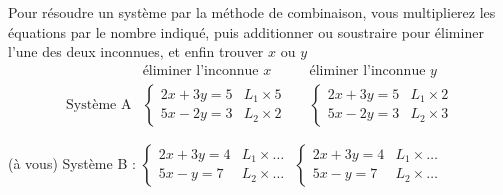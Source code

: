 \documentclass[main.tex]{subfiles}
\begin{document}
%	 
\begin{example} 
	Pour résoudre un système par la méthode de combinaison, vous multiplierez les équations par le nombre indiqué, puis additionner ou soustraire pour éliminer l’une des deux inconnues, et enfin trouver $x$ ou $y$  \vspace{-1em}
	\begin{align*} 
		& \text{éliminer l'inconnue $x$} && 
		\text{éliminer l'inconnue $y$}\\
		\text{Système A}&\begin{cases}
			2x + 3y = 5 & L_1 \times 5\\
			5x - 2y = 3 & L_2 \times 2 
		\end{cases}
		&& \begin{cases}
			2x + 3y = 5 & L_1 \times 2\\
			5x - 2y = 3
			& L_2 \times 3
		\end{cases}
	\end{align*}
\vfill

\noindent (à vous) Système B : 
 $\begin{cases}
 	2x+3y = 4 & L_1 \times \ldots\\
 	5x - y = 7
 	& L_2 \times \ldots 
 \end{cases} $
 \hfill 
 $\begin{cases}
 	2x+3y = 4 & L_1 \times \ldots\\
 	5x - y = 7
 	& L_2 \times \ldots
 \end{cases}$
 \hfill \null  
\end{example}
\vfill
\newpage
\end{document}
